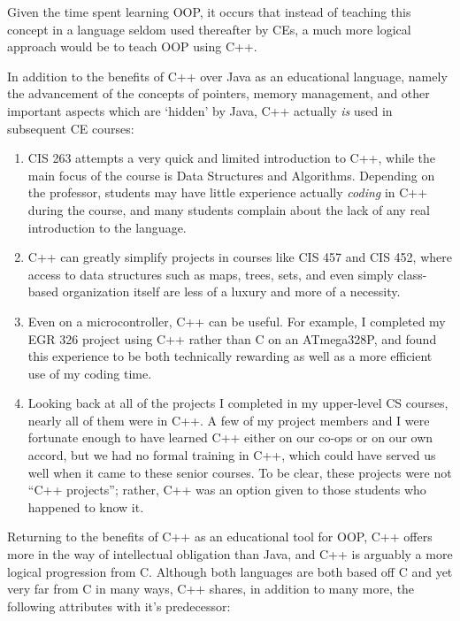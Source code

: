 \documentclass[12pt]{article}
\numberwithin{figure}{section}
\numberwithin{equation}{section}
\begin{document}
{\bigskip

Given the time spent learning OOP, it occurs that instead of teaching
this concept in a language seldom used thereafter by CEs, a much more
logical approach would be to teach OOP using C++.

\bigskip

In addition to the benefits of C++ over Java as an educational language,
namely the advancement of the concepts of pointers, memory management,
and other important aspects which are `hidden' by Java, C++ actually
\emph{is} used in subsequent CE courses:

\begin{enumerate}
\item   CIS 263 attempts a very quick and limited introduction to C++, while
        the main focus of the course is Data Structures and Algorithms.
        Depending on the professor, students may have little experience
        actually \emph{coding} in C++ during the course, and many students
        complain about the lack of any real introduction to the language.
\item   C++ can greatly simplify projects in courses like CIS 457 and CIS 452,
        where access to data structures such as maps, trees, sets, and even
        simply class-based organization itself are less of a luxury and more
        of a necessity.
\item   Even on a microcontroller, C++ can be useful. For example, I completed
        my EGR 326 project using C++ rather than C on an ATmega328P, and found
        this experience to be both technically rewarding as well as a more
        efficient use of my coding time.
\item   Looking back at all of the projects I completed in my upper-level CS courses, nearly all of them were in C++. A few of my project members and I were fortunate enough to have learned C++ either on our co-ops or on our own accord, but we had no formal training in C++, which could have served us well when it came to these senior courses. To be clear, these projects were not ``C++ projects''; rather, C++ was an option given to those students who happened to know it.
\end{enumerate}

Returning to the benefits of C++ as an educational tool for OOP, C++
offers more in the way of intellectual obligation than Java, and C++ is
arguably a more logical progression from C. Although both languages are
both based off C and yet very far from C in many ways, C++ shares, in
addition to many more, the following attributes with it's predecessor:

}
\end{document}
